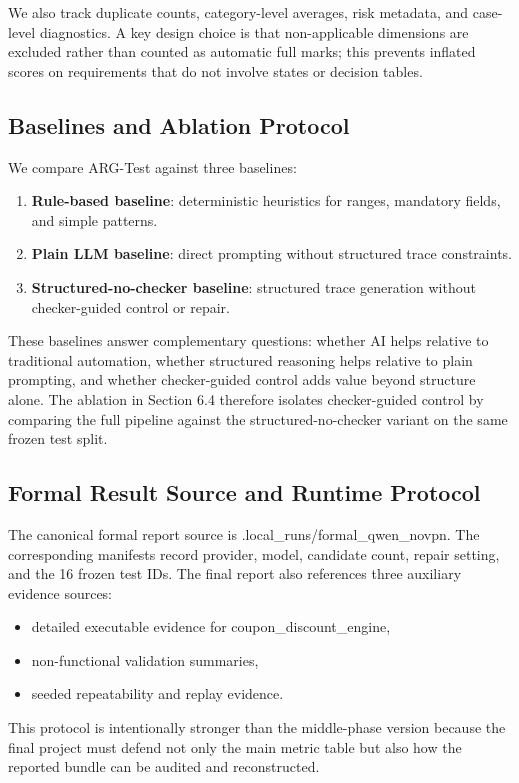 \documentclass{article}
\renewcommand{\texttt}[1]{{\normalfont #1}}
\begin{document}
We also track duplicate counts, category-level averages, risk metadata, and case-level diagnostics. A key design choice is that non-applicable dimensions are excluded rather than counted as automatic full marks; this prevents inflated scores on requirements that do not involve states or decision tables.

\subsection{Baselines and Ablation Protocol}
We compare ARG-Test against three baselines:
\begin{enumerate}[leftmargin=1.5em]
\item \textbf{Rule-based baseline}: deterministic heuristics for ranges, mandatory fields, and simple patterns.
\item \textbf{Plain LLM baseline}: direct prompting without structured trace constraints.
\item \textbf{Structured-no-checker baseline}: structured trace generation without checker-guided control or repair.
\end{enumerate}

These baselines answer complementary questions: whether AI helps relative to traditional automation, whether structured reasoning helps relative to plain prompting, and whether checker-guided control adds value beyond structure alone. The ablation in Section 6.4 therefore isolates checker-guided control by comparing the full pipeline against the structured-no-checker variant on the same frozen test split.

\subsection{Formal Result Source and Runtime Protocol}
The canonical formal report source is \texttt{.local\_runs/formal\_qwen\_novpn}. The corresponding manifests record provider, model, candidate count, repair setting, and the 16 frozen test IDs. The final report also references three auxiliary evidence sources:
\begin{itemize}[leftmargin=1.5em]
\item detailed executable evidence for \texttt{coupon\_discount\_engine},
\item non-functional validation summaries,
\item seeded repeatability and replay evidence.
\end{itemize}

This protocol is intentionally stronger than the middle-phase version because the final project must defend not only the main metric table but also how the reported bundle can be audited and reconstructed.
\end{document}
